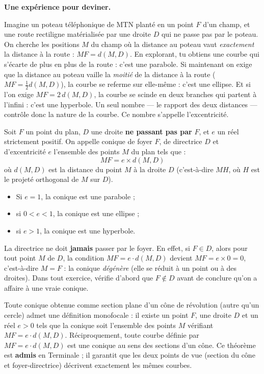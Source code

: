 \documentclass[11pt]{article}
\newcommand{\cle}[1]{{\popxbold\color{popdark}#1}}
\begin{document}
\textbf{Une expérience pour deviner.}\par
Imagine un poteau téléphonique de MTN planté en un point $F$ d'un champ, et une route rectiligne matérialisée par une droite $D$ qui ne passe pas par le poteau. On cherche les positions $M$ du champ où la distance au poteau vaut \emph{exactement} la distance à la route : $MF = d(M, D)$. En explorant, tu obtiens une courbe qui s'écarte de plus en plus de la route : c'est une \cle{parabole}. Si maintenant on exige que la distance au poteau vaille la \emph{moitié} de la distance à la route ($MF = \frac{1}{2}d(M,D)$), la courbe se referme sur elle-même : c'est une \cle{ellipse}. Et si l'on exige $MF = 2\,d(M,D)$, la courbe se scinde en deux branches qui partent à l'infini : c'est une \cle{hyperbole}. Un seul nombre — le rapport des deux distances — contrôle donc la nature de la courbe. Ce nombre s'appelle l'\cle{excentricité}.

\begin{definition}
Soit $F$ un point du plan, $D$ une droite \textbf{ne passant pas par} $F$, et $e$ un réel strictement positif. On appelle \cle{conique} de \cle{foyer} $F$, de \cle{directrice} $D$ et d'\cle{excentricité} $e$ l'ensemble des points $M$ du plan tels que :
\[ MF = e \times d(M, D) \]
où $d(M, D)$ est la distance du point $M$ à la droite $D$ (c'est-à-dire $MH$, où $H$ est le projeté orthogonal de $M$ sur $D$).
\begin{itemize}
\item Si $e = 1$, la conique est une \cle{parabole} ;
\item si $0 < e < 1$, la conique est une \cle{ellipse} ;
\item si $e > 1$, la conique est une \cle{hyperbole}.
\end{itemize}
\end{definition}

\begin{attention}
La directrice ne doit \textbf{jamais} passer par le foyer. En effet, si $F \in D$, alors pour tout point $M$ de $D$, la condition $MF = e \cdot d(M,D)$ devient $MF = e \times 0 = 0$, c'est-à-dire $M = F$ : la conique \emph{dégénère} (elle se réduit à un point ou à des droites). Dans tout exercice, vérifie d'abord que $F \notin D$ avant de conclure qu'on a affaire à une vraie conique.
\end{attention}

\begin{propriete}
Toute conique obtenue comme section plane d'un cône de révolution (autre qu'un cercle) admet une définition monofocale : il existe un point $F$, une droite $D$ et un réel $e > 0$ tels que la conique soit l'ensemble des points $M$ vérifiant $MF = e \cdot d(M,D)$. Réciproquement, toute courbe définie par $MF = e \cdot d(M,D)$ est une conique au sens des sections d'un cône. Ce théorème est \textbf{admis} en Terminale ; il garantit que les deux points de vue (section du cône et foyer-directrice) décrivent exactement les mêmes courbes.
\end{propriete}
\end{document}
